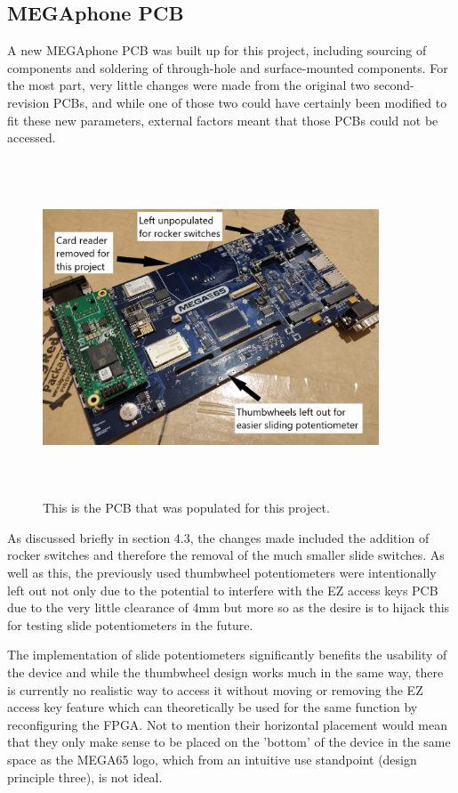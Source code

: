 \subsection{MEGAphone PCB}
A new MEGAphone PCB was built up for this project, including sourcing of components and soldering of through-hole and surface-mounted components.
For the most part, very little changes were made from the original two second-revision PCBs, and while one of those two could have certainly been modified to fit these new parameters, external factors meant that those PCBs could not be accessed.

\begin{figure} [h]
    \centering
    \includegraphics[width=10cm,height=10cm,keepaspectratio]{Figures/megaphone_pcb.png}
    \caption{This is the PCB that was populated for this project.}
    \label{fig:PCB}
\end{figure}

As discussed briefly in section 4.3, the changes made included the addition of rocker switches and therefore the removal of the much smaller slide switches. %
As well as this, the previously used thumbwheel potentiometers were intentionally left out not only due to the potential to interfere with the EZ access keys PCB due to the very little clearance of 4mm but more so as the desire is to hijack this for testing slide potentiometers in the future.

The implementation of slide potentiometers significantly benefits the usability of the device and while the thumbwheel design works much in the same way, there is currently no realistic way to access it without moving or removing the EZ access key feature which can theoretically be used for the same function by reconfiguring the FPGA.
Not to mention their horizontal placement would mean that they only make sense to be placed on the 'bottom' of the device in the same space as the MEGA65 logo, which from an intuitive use standpoint (design principle three), is not ideal.

